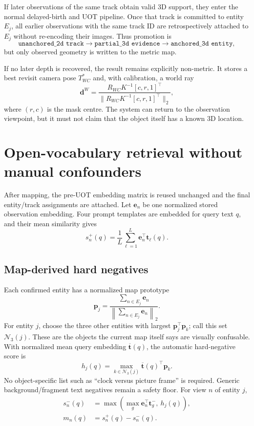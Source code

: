 \documentclass[11pt]{article}
\newcommand{\1}{\bm{1}}
\begin{document}
If later observations of the same track obtain valid 3D support, they enter the
normal delayed-birth and UOT pipeline. Once that track is committed to entity
$E_j$, all earlier observations with the same track ID are retrospectively
attached to $E_j$ without re-encoding their images. Thus promotion is
\begin{equation}
\texttt{unanchored\_2d track}
\longrightarrow \texttt{partial\_3d evidence}
\longrightarrow \texttt{anchored\_3d entity},
\end{equation}
but only observed geometry is written to the metric map.

If no later depth is recovered, the result remains explicitly non-metric. It
stores a best revisit camera pose $T^*_{WC}$ and, with calibration, a world ray
\begin{equation}
\bm d^W=\frac{R_{WC}K^{-1}[c,r,1]^\top}
{\|R_{WC}K^{-1}[c,r,1]^\top\|_2},
\end{equation}
where $(r,c)$ is the mask centre. The system can return to the observation
viewpoint, but it must not claim that the object itself has a known 3D location.

\section{Open-vocabulary retrieval without manual confounders}

After mapping, the pre-UOT embedding matrix is reused unchanged and the final
entity/track assignments are attached. Let $\bm e_n$ be one normalized stored
observation embedding. Four prompt templates are embedded for query text $q$,
and their mean similarity gives
\begin{equation}
s_n^+(q)=\frac{1}{L}\sum_{\ell=1}^{L}
\bm e_n^\top\bm t_{\ell}(q).
\end{equation}

\subsection{Map-derived hard negatives}

Each confirmed entity has a normalized map prototype
\begin{equation}
\bm p_j=\frac{\sum_{n\in E_j}\bm e_n}
{\left\|\sum_{n\in E_j}\bm e_n\right\|_2}.
\end{equation}
For entity $j$, choose the three other entities with largest
$\bm p_j^\top\bm p_k$; call this set $\mathcal N_3(j)$. These are the objects the
current map itself says are visually confusable. With normalized mean query
embedding $\overline{\bm t}(q)$, the automatic hard-negative score is
\begin{equation}
h_j(q)=\max_{k\in\mathcal N_3(j)}
\overline{\bm t}(q)^\top\bm p_k.
\label{eq:map-negative}
\end{equation}
No object-specific list such as ``clock versus picture frame'' is required.
Generic background/fragment text negatives remain a safety floor. For view $n$
of entity $j$,
\begin{align}
s_n^-(q)&=\max\left(
\max_g\bm e_n^\top\bm t_g^-,\ h_j(q)\right),\\
m_n(q)&=s_n^+(q)-s_n^-(q).
\end{align}
\end{document}
